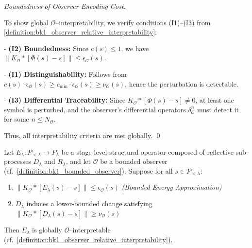 \begin{proof}[Boundedness of Observer Encoding Cost]
\label{proof:bk1_boundedness_encoding_cost}
\leavevmode

To show global $\mathcal{O}$–interpretability, we verify conditions (I1)–(I3) from \ref{definition:bk1_observer_relative_interpretability}:

- \textbf{(I2) Boundedness:} Since \(c(s) \le 1\), we have  
  \(\|K_{\mathcal{O}} \ast [\Phi(s) - s]\| \le \epsilon_{\mathcal{O}}(s)\).

- \textbf{(I1) Distinguishability:} Follows from  
  \(c(s) \cdot \epsilon_{\mathcal{O}}(s) \ge c_{\min} \cdot \epsilon_{\mathcal{O}}(s) \ge \nu_{\mathcal{O}}(s)\),  
  hence the perturbation is detectable.

- \textbf{(I3) Differential Traceability:} Since \(K_{\mathcal{O}} \ast [\Phi(s) - s] \ne 0\),  
  at least one symbol is perturbed, and the observer’s differential operators \(\delta^n_{\mathcal{O}}\)  
  must detect it for some \(n \le N_{\mathcal{O}}\).

Thus, all interpretability criteria are met globally. \qed

\end{proof}

\vspace{1em}

\begin{proposition}
\label{proposition:bk1_stage_composite_operators_are_interpretable}

Let \(E_\lambda : P_{<\lambda} \to P_\lambda\) be a stage-level structural operator  
composed of reflective sub-processes \(D_\lambda\) and \(R_\lambda\),  
and let \(\mathcal{O}\) be a bounded observer (cf.~\ref{definition:bk1_bounded_observer}).  
Suppose for all \(s \in P_{<\lambda}\):

\begin{enumerate}[label=(\alph*)]
    \item \(\|K_{\mathcal{O}} \ast [E_\lambda(s) - s]\| \le \epsilon_{\mathcal{O}}(s)\) \hfill \textit{(Bounded Energy Approximation)}
    \item \(D_\lambda\) induces a lower-bounded change satisfying \(\|K_{\mathcal{O}} \ast [D_\lambda(s) - s]\| \ge \nu_{\mathcal{O}}(s)\)
\end{enumerate}

Then \(E_\lambda\) is globally \(\mathcal{O}\)–interpretable (cf.~\ref{definition:bk1_observer_relative_interpretability}).

\end{proposition}

